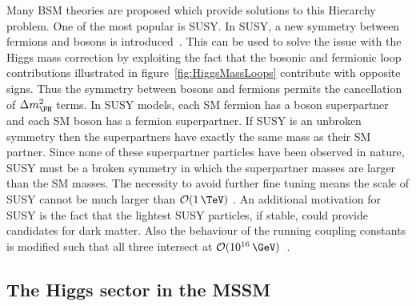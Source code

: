 Many \ac{BSM} theories are proposed which provide solutions to this Hierarchy
problem. One of the most popular is \ac{SUSY}. In \ac{SUSY}, a new
symmetry between fermions and bosons is introduced~\cite{Martin:1997ns}. This
can be used to solve the issue with the Higgs mass correction by exploiting the
fact that the bosonic and fermionic loop contributions illustrated in 
figure~\ref{fig:HiggsMassLoops} contribute with opposite signs. Thus the symmetry
between bosons and fermions permits the cancellation of $\Delta m_{\PH}^{2}$
terms. In SUSY models, each \ac{SM} fermion has a boson superpartner and each
\ac{SM} boson has a fermion superpartner. If \ac{SUSY} is an unbroken symmetry then
the superpartners have exactly the same mass as their \ac{SM} partner. Since
none of these superpartner particles have been observed in nature, \ac{SUSY} must be
a broken symmetry in which the superpartner masses are larger than the
\ac{SM} masses. The necessity to avoid further fine tuning means the scale of
\ac{SUSY} cannot be much larger than $\mathcal{O}(1\,\TeV)$ \cite{Barbieri198863}. An additional motivation
for \ac{SUSY} is the fact that the lightest \ac{SUSY} particles, if stable, could provide
candidates for dark matter. Also the behaviour of the running coupling
constants is modified such that all three intersect at
$\mathcal{O}(10^{16}\,\GeV)$~\cite{Amaldi:1991cn}.

\subsection{The Higgs sector in the MSSM}
\label{sec:mssmhiggs}

